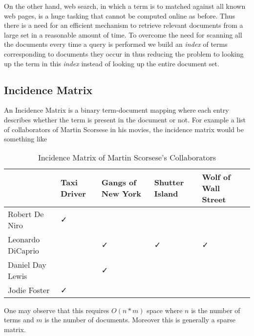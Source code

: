On the other hand, web search, in which a term is to matched against all known web pages, is a huge tasking that cannot be computed online as before.
Thus there is a need for an efficient mechanism to retrieve relevant documents from a large set in a reasonable amount of time.
To overcome the need for scanning all the documents every time a query is performed we build an \textit{index} of terms corresponding to
documents they occur in thus reducing the problem to looking up the term in this \textit{index} instead of looking up the entire document set.

\subsection{Incidence Matrix}
An Incidence Matrix is a binary term-document mapping where each entry describes whether the term is present in the document or not.
For example a list of collaborators of Martin Scorsese in his movies, the incidence matrix would be something like

\begin{table}[ht]
  \caption{Incidence Matrix of Martin Scorsese's Collaborators}
  \centering
  \begin{tabular}{p{4cm}p{2cm}p{2cm}p{2cm}p{2cm}}
    \hline \hline
                      & Taxi Driver & Gangs of New York & Shutter Island & Wolf of Wall Street  \\
    \hline
    Robert De Niro    &      ✓      &                   &                &                      \\
    Leonardo DiCaprio &             &        ✓          &         ✓      &           ✓          \\
    Daniel Day Lewis  &             &        ✓          &                &                      \\
    Jodie Foster      &      ✓      &                   &                &                      \\
  \end{tabular}
\end{table}

One may observe that this requires $O(n*m)$ space where $n$ is the number of terms and $m$ is the number of documents.
Moreover this is generally a sparse matrix.

